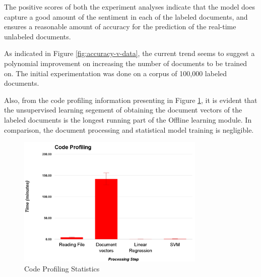 \documentclass[conference]{IEEEtran}
\begin{document}
        \begin{table}[ht] \caption{Evaluation results} \label{results}
            \centering
        \end{table}

        The positive scores of both the experiment analyses indicate that the model does capture a good amount of the sentiment in each of the labeled documents, and ensures a reasonable amount of accuracy for the prediction of the real-time unlabeled documents.

        As indicated in Figure \ref{fig:accuracy-v-data}, the current trend seems to suggest a polynomial improvement on increasing the number of documents to be trained on. 
        The initial experimentation was done on a corpus of 100,000 labeled documents. 

        Also, from the code profiling information presenting in Figure \ref{fig:code-profiling}, it is evident that the unsupervised learning segement of obtaining the document vectors of the labeled documents is the longest running part of the Offline learning module. In comparison, the document processing and statistical model training is negligible.

\begin{figure}[ht]
    \centering
    \includegraphics[width=0.8\textwidth]{images/code_profiling.png}
    \caption{Code Profiling Statistics}
    \label{fig:code-profiling}
\end{figure}
\end{document}
